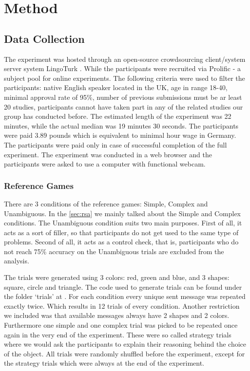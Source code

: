 ﻿\chapter{Method}

\section{Data Collection}
\label{sec:data}
The experiment was hosted through an open-source crowdsourcing client/system server system LingoTurk \cite{lingoturk}.
While the participants were recruited via Prolific \cite{prolific} - a subject pool for online experiments. The following criteria were used to filter the participants: native English speaker located in the UK, age in range 18-40, minimal approval rate of 95\%, number of previous submissions must be ar least 20 studies, participants cannot have taken part in any of the related studies our group has conducted before. The estimated length of the experiment was 22 minutes, while the actual median was 19 minutes 30 seconds. The participants were paid 3.89 pounds which is equivalent to minimal hour wage in Germany. The participants were paid only in case of successful completion of the full experiment. The experiment was conducted in a web browser and the participants were asked to use a computer with functional webcam. 


\subsection{Reference Games}
\label{sec:data:ref_games}
There are 3 conditions of the reference games: Simple, Complex and Unambiguous. In the \autoref{sec:rsa} we mainly talked about the Simple and Complex conditions. The Unambiguous condition suits two main purposes. First of all, it acts as a sort of filler, so that participants do not get used to the same type of problems. Second of all, it acts as a control check, that is, participants who do not reach 75\% accuracy on the Unambiguous trials are excluded from the analysis.

The trials were generated using 3 colors: red, green and blue, and 3 shapes: square, circle and triangle. The code used to generate trials can be found under the folder `trials' at \cite{github}. For each condition every unique sent message was repeated exactly twice. Which results in 12 trials of every condition. Another restriction we included was that available messages always have 2 shapes and 2 colors. Furthermore one simple and one complex trial was picked to be repeated once again in the very end of the experiment. These were so called strategy trials where we would ask the participants to explain their reasoning behind the choice of the object. All trials were randomly shuffled before the experiment, except for the strategy trials which were always at the end of the experiment.

